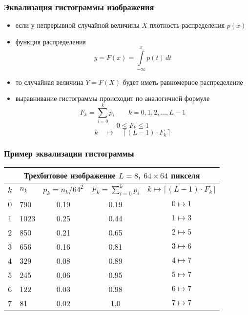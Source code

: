 \documentclass[
    12pt, 
    usepdftitle=false,
    aspectratio=1610
]{beamer}
\begin{document}
\begin{frame}
\frametitle{Эквализация гистограммы изображения}
\begin{itemize}
        \item если у непрерывной случайной величины $X$ плотность распределения $p(x)$
        \item функция распределения
        $$
            y=F(x)=\int\limits_{-\infty}^xp(t)\,dt
        $$
        \item то случайная величина $Y=F\left(X\right)$ будет иметь равномерное распределение
        \item выравнивание гистограммы происходит по аналогичной формуле
        $$
            F_k=\sum_{i=0}^k p_i\qquad
            k=0,1,2,\ldots,L-1
        $$
        $$
            0\leqslant F_k \leqslant 1
        $$
        $$
            k\quad\mapsto\quad
            \left\lceil(L-1)\cdot F_k\right\rceil
        $$
    \end{itemize}
\end{frame}

\begin{frame}
    \frametitle{Пример эквализации гистограммы}
    \begin{center}
    \begin{tabular}{ |c|p{1cm}|c|c|c|  }
        \hline
        \multicolumn{5}{|c|}{\textbf{Трехбитовое изображение $L=8$, $64\times64$ пикселя}} \\
        \hline
        $k$ & $n_k$ & $p_k=n_k/64^2$ & $F_k=\sum_{i=0}^k p_i$ & $k\mapsto\lceil(L-1)\cdot F_k\rceil$\\
        \hline
        \hline
        0 & 790  & 0.19 & 0.19 & $0\mapsto1$\\
        1 & 1023 & 0.25 & 0.44 & $1\mapsto3$\\
        2 & 850  & 0.21 & 0.65 & $2\mapsto5$\\
        3 & 656  & 0.16 & 0.81 & $3\mapsto6$\\
        4 & 329  & 0.08 & 0.89 & $4\mapsto7$\\
        5 & 245  & 0.06 & 0.95 & $5\mapsto7$\\
        6 & 122  & 0.03 & 0.98 & $6\mapsto7$\\
        7 & 81   & 0.02 & 1.0  & $7\mapsto7$\\
        \hline
    \end{tabular}
    \end{center}
    \begin{figure}[t]%
        \centering
       
    \end{figure}
\end{frame}
\end{document}
